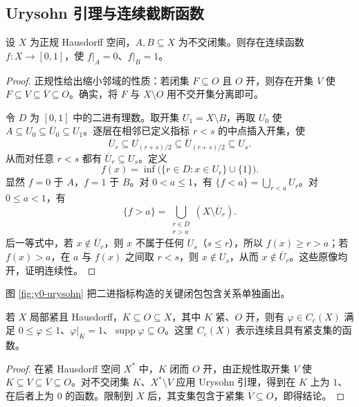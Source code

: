 \subsection{Urysohn 引理与连续截断函数}
\begin{theorem}[Urysohn 引理]\label{thm:y0-urysohn}
设 $X$ 为正规 Hausdorff 空间，$A,B\subseteq X$ 为不交闭集。则存在连续函数 $f:X\to[0,1]$，使 $f|_A=0$、$f|_B=1$。
\end{theorem}
\begin{proof}
正规性给出缩小邻域的性质：若闭集 $F\subseteq O$ 且 $O$ 开，则存在开集 $V$ 使 $F\subseteq V\subseteq\overline V\subseteq O$。确实，将 $F$ 与 $X\setminus O$ 用不交开集分离即可。

令 $D$ 为 $[0,1]$ 中的二进有理数。取开集 $U_1=X\setminus B$，再取 $U_0$ 使 $A\subseteq U_0\subseteq\overline U_0\subseteq U_1$。逐层在相邻已定义指标 $r<s$ 的中点插入开集，使
\[
 \overline U_r\subseteq U_{(r+s)/2}
 \subseteq\overline U_{(r+s)/2}\subseteq U_s.
\]
从而对任意 $r<s$ 都有 $\overline U_r\subseteq U_s$。定义
\[
 f(x)=\inf\bigl(\{r\in D:x\in U_r\}\cup\{1\}\bigr).
\]
显然 $f=0$ 于 $A$，$f=1$ 于 $B$。对 $0<a\le1$，有 $\{f<a\}=\bigcup_{r<a}U_r$。对 $0\le a<1$，有
\[
 \{f>a\}=\bigcup_{\substack{r\in D\\r>a}}
                     (X\setminus\overline U_r).
\]
后一等式中，若 $x\notin\overline U_r$，则 $x$ 不属于任何 $U_s$（$s\le r$），所以 $f(x)\ge r>a$；若 $f(x)>a$，在 $a$ 与 $f(x)$ 之间取 $r<s$，则 $x\notin U_s$，从而 $x\notin\overline U_r$。这些原像均开，证明连续性。
\end{proof}

图 \ref{fig:y0-urysohn} 把二进指标构造的关键闭包包含关系单独画出。



\begin{corollary}[局部紧空间中的截断函数]\label{cor:y0-cutoff}
若 $X$ 局部紧且 Hausdorff，$K\subseteq O\subseteq X$，其中 $K$ 紧、$O$ 开，则有 $\varphi\in C_c(X)$ 满足 $0\le\varphi\le1$、$\varphi|_K=1$、$\operatorname{supp}\varphi\subseteq O$。这里 $C_c(X)$ 表示连续且具有紧支集的函数。
\end{corollary}
\begin{proof}
在紧 Hausdorff 空间 $X^*$ 中，$K$ 闭而 $O$ 开，由正规性取开集 $V$ 使 $K\subseteq V\subseteq\overline V\subseteq O$。对不交闭集 $K$、$X^*\setminus V$ 应用 Urysohn 引理，得到在 $K$ 上为 $1$、在后者上为 $0$ 的函数。限制到 $X$ 后，其支集包含于紧集 $\overline V\subseteq O$，即得结论。
\end{proof}

